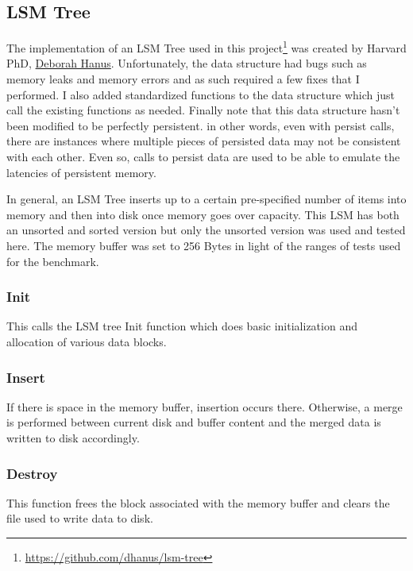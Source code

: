 \documentclass[twocolumn]{article}
\begin{document}
\subsection{LSM Tree}

The implementation of an LSM Tree used in this
project\footnote{\url{https://github.com/dhanus/lsm-tree}} was created by
Harvard PhD, \href{https://dhanus.github.io/}{Deborah Hanus}. Unfortunately, the
data structure had bugs such as memory leaks and memory errors and as such
required a few fixes that I performed. I also added standardized functions to
the data structure which just call the existing functions as needed. Finally
note that this data structure hasn't been modified to be perfectly persistent.
in other words, even with persist calls, there are instances where multiple
pieces of persisted data may not be consistent with each other. Even so, calls
to persist data are used to be able to emulate the latencies of persistent
memory.

In general, an LSM Tree \cite{oneil:actainformatica96} inserts up to a certain
pre-specified number of items into memory and then into disk once memory goes
over capacity. This LSM has both an unsorted and sorted version but only the
unsorted version was used and tested here. The memory buffer was set to 256
Bytes in light of the ranges of tests used for the benchmark.

\subsubsection{Init}

This calls the LSM tree Init function which does basic initialization and
allocation of various data blocks.

\subsubsection{Insert}

If there is space in the memory buffer, insertion occurs there. Otherwise, a
merge is performed between current disk and buffer content and the merged data
is written to disk accordingly.

\subsubsection{Destroy}

This function frees the block associated with the memory buffer and clears the
file used to write data to disk.
\end{document}
